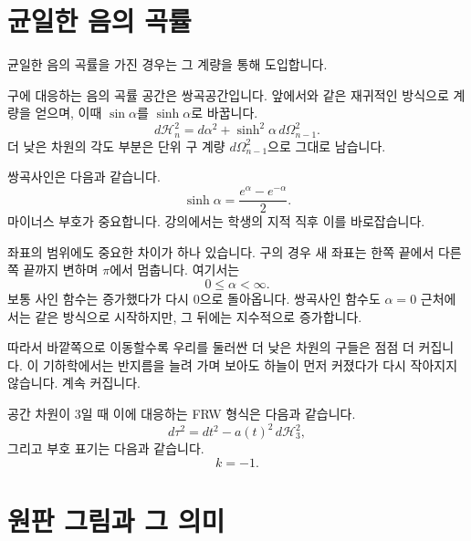 \section{균일한 음의 곡률}

균일한 음의 곡률을 가진 경우는 그 계량을 통해 도입합니다.

구에 대응하는 음의 곡률 공간은 쌍곡공간입니다. 앞에서와 같은 재귀적인 방식으로 계량을 얻으며, 이때 \(\sin\alpha\)를 \(\sinh\alpha\)로 바꿉니다.
\begin{equation}
d\mathcal H_n^2=d\alpha^2+\sinh^2\alpha\,d\Omega_{n-1}^2.
\end{equation}
더 낮은 차원의 각도 부분은 단위 구 계량 \(d\Omega_{n-1}^2\)으로 그대로 남습니다.

\begin{classroomqa}
\end{classroomqa}

쌍곡사인은 다음과 같습니다.
\begin{equation}
\sinh\alpha=\frac{e^\alpha-e^{-\alpha}}{2}.
\end{equation}
마이너스 부호가 중요합니다. 강의에서는 학생의 지적 직후 이를 바로잡습니다.

좌표의 범위에도 중요한 차이가 하나 있습니다. 구의 경우 새 좌표는 한쪽 끝에서 다른 쪽 끝까지 변하며 \(\pi\)에서 멈춥니다. 여기서는
\begin{equation}
0\leq \alpha<\infty.
\end{equation}
보통 사인 함수는 증가했다가 다시 0으로 돌아옵니다. 쌍곡사인 함수도 \(\alpha=0\) 근처에서는 같은 방식으로 시작하지만, 그 뒤에는 지수적으로 증가합니다.

따라서 바깥쪽으로 이동할수록 우리를 둘러싼 더 낮은 차원의 구들은 점점 더 커집니다. 이 기하학에서는 반지름을 늘려 가며 보아도 하늘이 먼저 커졌다가 다시 작아지지 않습니다. 계속 커집니다.

공간 차원이 3일 때 이에 대응하는 FRW 형식은 다음과 같습니다.
\begin{equation}
d\tau^2=dt^2-a(t)^2\,d\mathcal H_3^2,
\end{equation}
그리고 부호 표기는 다음과 같습니다.
\begin{equation}
k=-1.
\end{equation}

\section{원판 그림과 그 의미}

